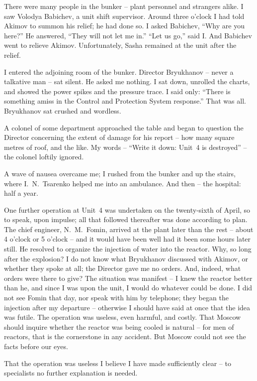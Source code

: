\documentclass[openright]{bookest}
\begin{document}
There were many people in the bunker -- plant personnel and strangers alike. I saw Volodya Babichev, a unit shift supervisor. Around three o'clock I had told Akimov to summon his relief; he had done so. I asked Babichev, ``Why are you here?'' He answered, ``They will not let me in.'' ``Let us go,'' said I. And Babichev went to relieve Akimov. Unfortunately, Sasha remained at the unit after the relief.

I entered the adjoining room of the bunker. Director Bryukhanov -- never a talkative man -- sat silent. He asked me nothing. I sat down, unrolled the charts, and showed the power spikes and the pressure trace. I said only: ``There is something amiss in the Control and Protection System response.'' That was all. Bryukhanov sat crushed and wordless.


A colonel of some department approached the table and began to question the Director concerning the extent of damage for his report -- how many square metres of roof, and the like. My words -- ``Write it down: Unit~4 is destroyed'' -- the colonel loftily ignored.

A wave of nausea overcame me; I rushed from the bunker and up the stairs, where I.~N.~Tsarenko helped me into an ambulance. And then -- the hospital: half a year.

One further operation at Unit~4 was undertaken on the twenty-sixth of April, so to speak, upon impulse; all that followed thereafter was done according to plan. The chief engineer, N.~M.~Fomin, arrived at the plant later than the rest -- about 4 o'clock or 5 o'clock -- and it would have been well had it been some hours later still. He resolved to organize the injection of water into the reactor. Why, so long after the explosion? I do not know what Bryukhanov discussed with Akimov, or whether they spoke at all; the Director gave me no orders. And, indeed, what orders were there to give? The situation was manifest -- I knew the reactor better than he, and since I was upon the unit, I would do whatever could be done. I did not see Fomin that day, nor speak with him by telephone; they began the injection after my departure -- otherwise I should have said at once that the idea was futile. The operation was useless, even harmful, and costly. That Moscow should inquire whether the reactor was being cooled is natural -- for men of reactors, that is the cornerstone in any accident. But Moscow could not see the facts before our eyes.

That the operation was useless I believe I have made sufficiently clear -- to specialists no further explanation is needed.
\end{document}
